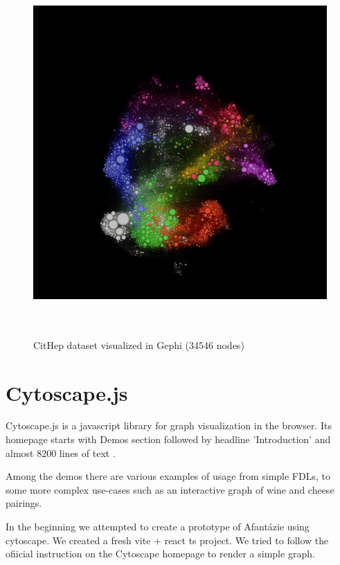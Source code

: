 \begin{figure}[p]\centering
  \includegraphics[width=140mm, height=140mm]{img/gephi_cithep_35k.png}
  \caption{CitHep dataset visualized in Gephi (34546 nodes)}
  \label{obr:gephi_cithep}
\end{figure}

\section{Cytoscape.js}

Cytoscape.js is a javascript library for graph visualization in the browser.
Its homepage starts with Demos section followed by headline 'Introduction' and almost 8200 lines of text \cite{cytoscapes_js_homepage}.

Among the demos there are various examples of usage from simple FDLs, to some more complex use-cases such as an interactive graph of wine and cheese pairings. 

In the beginning we attempted to create a prototype of Afantázie using cytoscape.
We created a fresh vite + react ts project. We tried to follow the ofiicial instruction on the Cytoscape homepage to render a simple graph.


